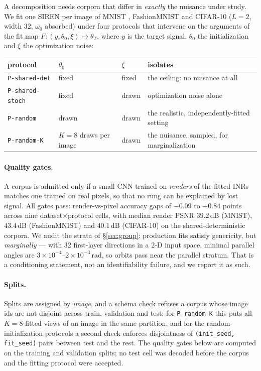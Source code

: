 \documentclass[10pt,letterpaper]{article}
\theoremstyle{definition}
\begin{document}
A decomposition needs corpora that differ in \emph{exactly} the nuisance under study. We fit one
SIREN per image of MNIST \citep{lecun1998mnist}, FashionMNIST \citep{xiao2017fashion} and CIFAR-10
\citep{krizhevsky2009cifar} ($L=2$, width $32$, $\omega_0$ absorbed) under four protocols that intervene on
the arguments of the fit map $F : (y, \theta_0, \xi) \mapsto \theta_T$, where $y$ is the target
signal, $\theta_0$ the initialization and $\xi$ the optimization noise:

\begin{center}\small
\begin{tabular}{@{}llll@{}}
\toprule
protocol & $\theta_0$ & $\xi$ & isolates \\
\midrule
\texttt{P-shared-det}   & fixed & fixed & the ceiling: no nuisance at all \\
\texttt{P-shared-stoch} & fixed & drawn & optimization noise alone \\
\texttt{P-random}       & drawn & drawn & the realistic, independently-fitted setting \\
\texttt{P-random-K}     & $K{=}8$ draws per image & drawn & the nuisance, sampled, for marginalization \\
\bottomrule
\end{tabular}
\end{center}

\paragraph{Quality gates.} A corpus is admitted only if a small CNN trained on \emph{renders} of
the fitted INRs matches one trained on real pixels, so that no rung can be explained by lost
signal. All gates pass: render-vs-pixel accuracy gaps of $-0.09$ to $+0.84$ points across nine
dataset$\times$protocol cells, with median render PSNR $39.2$\,dB (MNIST), $43.4$\,dB
(FashionMNIST) and $40.1$\,dB (CIFAR-10) on the shared-deterministic corpora. We audit the strata of
\S\ref{sec:group}: production fits satisfy genericity, but \emph{marginally} --- with 32
first-layer directions in a 2-D input space, minimal parallel angles are
$3\times10^{-4}$--$2\times10^{-3}$\,rad, so orbits pass near the parallel stratum. That is a
conditioning statement, not an identifiability failure, and we report it as such.

\paragraph{Splits.} Splits are assigned by \emph{image}, and a schema check refuses a corpus whose
image ids are not disjoint across train, validation and test; for \texttt{P-random-K} this puts all
$K=8$ fitted views of an image in the same partition, and for the random-initialization protocols a
second check enforces disjointness of \texttt{(init\_seed, fit\_seed)} pairs between test and the
rest. The quality gates below are computed on the training and validation splits; no test cell was
decoded before the corpus and the fitting protocol were accepted.
\end{document}

